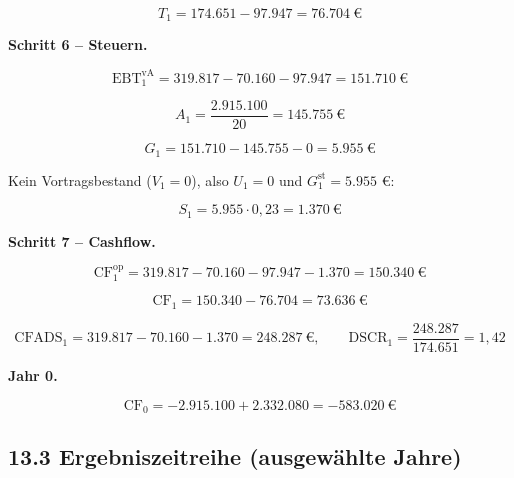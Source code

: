 \documentclass[
  a4paper,
  10pt]{article}
\begin{document}
\[ T_1 = 174.651 - 97.947 = 76.704\ \text{€} \]

\textbf{Schritt 6 -- Steuern.}

\[ \mathrm{EBT}^{\mathrm{vA}}_1 = 319.817 - 70.160 - 97.947 = 151.710\ \text{€} \]

\[ A_1 = \frac{2.915.100}{20} = 145.755\ \text{€} \]

\[ G_1 = 151.710 - 145.755 - 0 = 5.955\ \text{€} \]

Kein Vortragsbestand (\(V_1 = 0\)), also \(U_1 = 0\) und
\(G^{\mathrm{st}}_1 = 5.955\) €:

\[ S_1 = 5.955 \cdot 0{,}23 = 1.370\ \text{€} \]

\textbf{Schritt 7 -- Cashflow.}

\[ \mathrm{CF}^{\mathrm{op}}_1 = 319.817 - 70.160 - 97.947 - 1.370 = 150.340\ \text{€} \]

\[ \mathrm{CF}_1 = 150.340 - 76.704 = 73.636\ \text{€} \]

\[ \mathrm{CFADS}_1 = 319.817 - 70.160 - 1.370 = 248.287\ \text{€}, \qquad \mathrm{DSCR}_1 = \frac{248.287}{174.651} = 1{,}42 \]

\textbf{Jahr 0.}

\[ \mathrm{CF}_0 = -2.915.100 + 2.332.080 = -583.020\ \text{€} \]

\hypertarget{ergebniszeitreihe-ausgewuxe4hlte-jahre}{%
\subsection{13.3 Ergebniszeitreihe (ausgewählte
Jahre)}\label{ergebniszeitreihe-ausgewuxe4hlte-jahre}}
\end{document}
